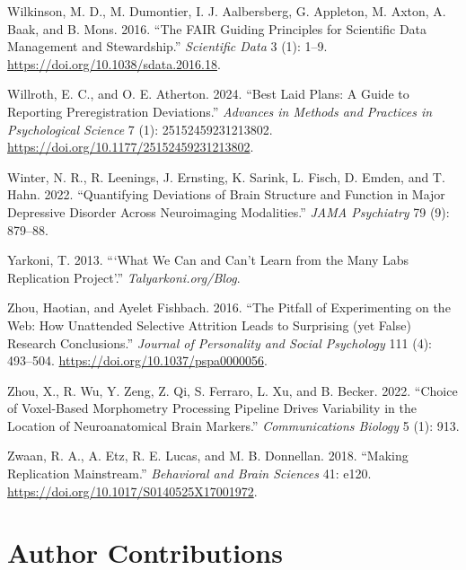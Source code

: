 \documentclass[
  letterpaper,
  DIV=11,
  openany,
  fontsize=12pt,
  parskip=half,
  headings=big,
  numbers=noenddot,
  titlepage=false]{scrreprt}
\newlength{\cslhangindent}
\newenvironment{CSLReferences}[2] %
 {\begin{list}{}{%
  \setlength{\itemindent}{0pt}
  \setlength{\leftmargin}{0pt}
  \setlength{\parsep}{0pt}
  \ifodd #1
   \setlength{\leftmargin}{\cslhangindent}
   \setlength{\itemindent}{-1\cslhangindent}
  \fi
  \setlength{\itemsep}{#2\baselineskip}}}
 {\end{list}}
\let\cleardoublepage\clearpage
\begin{document}
\begin{CSLReferences}{1}{0}
Wilkinson, M. D., M. Dumontier, I. J. Aalbersberg, G. Appleton, M.
Axton, A. Baak, and B. Mons. 2016. {``The FAIR Guiding Principles for
Scientific Data Management and Stewardship.''} \emph{Scientific Data} 3
(1): 1--9. \url{https://doi.org/10.1038/sdata.2016.18}.

Willroth, E. C., and O. E. Atherton. 2024. {``Best Laid Plans: A Guide
to Reporting Preregistration Deviations.''} \emph{Advances in Methods
and Practices in Psychological Science} 7 (1): 25152459231213802.
\url{https://doi.org/10.1177/25152459231213802}.

Winter, N. R., R. Leenings, J. Ernsting, K. Sarink, L. Fisch, D. Emden,
and T. Hahn. 2022. {``Quantifying Deviations of Brain Structure and
Function in Major Depressive Disorder Across Neuroimaging Modalities.''}
\emph{JAMA Psychiatry} 79 (9): 879--88.

Yarkoni, T. 2013. {``{`What We Can and Can't Learn from the Many Labs
Replication Project'}.''} \emph{Talyarkoni.org/Blog}.

Zhou, Haotian, and Ayelet Fishbach. 2016. {``The Pitfall of
Experimenting on the Web: How Unattended Selective Attrition Leads to
Surprising (yet False) Research Conclusions.''} \emph{Journal of
Personality and Social Psychology} 111 (4): 493--504.
\url{https://doi.org/10.1037/pspa0000056}.

Zhou, X., R. Wu, Y. Zeng, Z. Qi, S. Ferraro, L. Xu, and B. Becker. 2022.
{``Choice of Voxel-Based Morphometry Processing Pipeline Drives
Variability in the Location of Neuroanatomical Brain Markers.''}
\emph{Communications Biology} 5 (1): 913.

Zwaan, R. A., A. Etz, R. E. Lucas, and M. B. Donnellan. 2018. {``Making
Replication Mainstream.''} \emph{Behavioral and Brain Sciences} 41:
e120. \url{https://doi.org/10.1017/S0140525X17001972}.

\end{CSLReferences}

\cleardoublepage
{}
{}
\appendix

\chapter{Author Contributions}\label{author-contributions}
\end{document}
